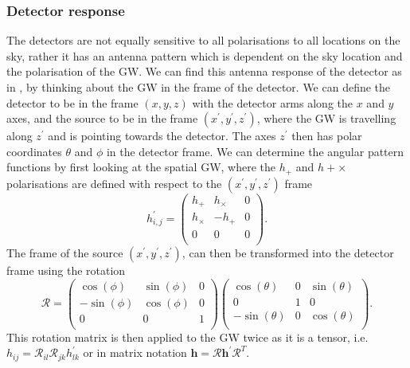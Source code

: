\subsubsection{Detector response}

The detectors are not equally sensitive to all polarisations to all locations on the sky, rather it has an antenna pattern which is dependent on the sky location and the polarisation of the \gls{GW}. 
We can find this antenna response of the detector as in \citep{maggioreGravitationalWaves}, by thinking about the \gls{GW} in the frame of the detector.
We can define the detector to be in the frame $(x,y,z)$ with the detector arms along the $x$ and $y$ axes, and the source to be in the frame $(x^{\prime},y^{\prime},z^{\prime})$, where the \gls{GW} is travelling along $z^{'}$ and is pointing towards the detector. 
The axes $z^{\prime}$ then has polar coordinates $\theta$ and $\phi$ in the detector frame.
We can determine the angular pattern functions by first looking at the spatial \gls{GW}, where the $h_{+}$ and $h+{\times}$ polarisations are defined with respect to the $(x^{\prime},y^{\prime},z^{\prime})$ frame
\begin{equation}
    \label{intro:detector:response:gwwave}
    h^{\prime}_{i,j} = \left( 
    \begin{matrix} 
    h_{+} & h_{\times} & 0 \\
    h_{\times} & -h_{+} & 0 \\
    0 & 0 & 0  \\
    \end{matrix}
    \right).
\end{equation}
The frame of the source $(x^{\prime},y^{\prime},z^{\prime})$, can then be transformed into the detector frame using the rotation
\begin{equation}
    \label{intro:detector:response:rotation}
    \mathcal{R} = \left( 
    \begin{matrix} 
    \cos(\phi) & \sin(\phi) & 0 \\
    -\sin(\phi) & \cos(\phi) & 0 \\
    0 & 0 & 1  \\
    \end{matrix}
    \right)
    \left( 
    \begin{matrix} 
    \cos(\theta) & 0 & \sin(\theta) \\
    0 & 1 & 0 \\
    -\sin(\theta) & 0 & \cos(\theta)  \\
    \end{matrix}
    \right).
\end{equation}
This rotation matrix is then applied to the \gls{GW} twice as it is a tensor, i.e. $h_{ij} = \mathcal{R}_{il} \mathcal{R}_{jk} h^{\prime}_{lk} $ or in matrix notation $\bm{h} = \bm{\mathcal{R}} \bm{h}^{\prime} \bm{\mathcal{R}}^{T}$.

